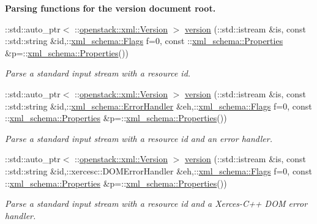 \begin{Indent}{\bf Parsing functions for the version document root.}
\begin{DoxyCompactItemize}
::std::auto\_\-ptr$<$ ::\hyperlink{classopenstack_1_1xml_1_1Version}{openstack::xml::Version} $>$ \hyperlink{namespaceopenstack_1_1xml_acd07ead1a645d03c672d40f8dbbce626}{version} (::std::istream \&is, const ::std::string \&id,::\hyperlink{namespacexml__schema_affb4c227cbd9aa7453dd1dc5a1401943}{xml\_\-schema::Flags} f=0, const ::\hyperlink{namespacexml__schema_ad27ce19a7ee1d3b1064092648898f64c}{xml\_\-schema::Properties} \&p=::\hyperlink{namespacexml__schema_ad27ce19a7ee1d3b1064092648898f64c}{xml\_\-schema::Properties}())
\begin{DoxyCompactList}\small\item\em Parse a standard input stream with a resource id. \item\end{DoxyCompactList}\item 
::std::auto\_\-ptr$<$ ::\hyperlink{classopenstack_1_1xml_1_1Version}{openstack::xml::Version} $>$ \hyperlink{namespaceopenstack_1_1xml_afec3a10dab849aa03c29d74147be2fc2}{version} (::std::istream \&is, const ::std::string \&id,::\hyperlink{namespacexml__schema_ab1c9361bfd3b404eaabf0c31eded79dc}{xml\_\-schema::ErrorHandler} \&eh,::\hyperlink{namespacexml__schema_affb4c227cbd9aa7453dd1dc5a1401943}{xml\_\-schema::Flags} f=0, const ::\hyperlink{namespacexml__schema_ad27ce19a7ee1d3b1064092648898f64c}{xml\_\-schema::Properties} \&p=::\hyperlink{namespacexml__schema_ad27ce19a7ee1d3b1064092648898f64c}{xml\_\-schema::Properties}())
\begin{DoxyCompactList}\small\item\em Parse a standard input stream with a resource id and an error handler. \item\end{DoxyCompactList}\item 
::std::auto\_\-ptr$<$ ::\hyperlink{classopenstack_1_1xml_1_1Version}{openstack::xml::Version} $>$ \hyperlink{namespaceopenstack_1_1xml_a28780f5a5373da0905d71b9fd6a547be}{version} (::std::istream \&is, const ::std::string \&id,::xercesc::DOMErrorHandler \&eh,::\hyperlink{namespacexml__schema_affb4c227cbd9aa7453dd1dc5a1401943}{xml\_\-schema::Flags} f=0, const ::\hyperlink{namespacexml__schema_ad27ce19a7ee1d3b1064092648898f64c}{xml\_\-schema::Properties} \&p=::\hyperlink{namespacexml__schema_ad27ce19a7ee1d3b1064092648898f64c}{xml\_\-schema::Properties}())
\begin{DoxyCompactList}\small\item\em Parse a standard input stream with a resource id and a Xerces-\/C++ DOM error handler. \item\end{DoxyCompactList}\item 

\end{DoxyCompactItemize}
\end{Indent}
